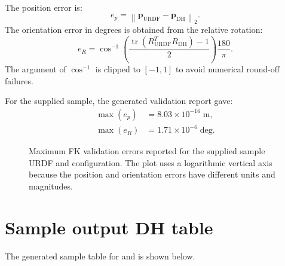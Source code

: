 \documentclass[11pt,a4paper]{article}
\newcommand{\norm}[1]{\left\lVert #1 \right\rVert}
\begin{document}
The position error is:
\begin{equation}
  e_p = \norm{\bm{p}_{\mathrm{URDF}} - \bm{p}_{\mathrm{DH}}}_2.
\end{equation}
The orientation error in degrees is obtained from the relative rotation:
\begin{equation}
  e_R = \cos^{-1}\left(\frac{\operatorname{tr}(R_{\mathrm{URDF}}^T R_{\mathrm{DH}})-1}{2}\right)\frac{180}{\pi}.
\end{equation}
The argument of $\cos^{-1}$ is clipped to $[-1,1]$ to avoid numerical round-off failures.

For the supplied sample, the generated validation report gave:
\begin{align}
  \max(e_p) &= 8.03\times 10^{-16}\;\mathrm{m}, \\
  \max(e_R) &= 1.71\times 10^{-6}\;\mathrm{deg}.
\end{align}

\begin{figure}[htbp]
\centering
{}
\caption{Maximum FK validation errors reported for the supplied sample URDF and configuration. The plot uses a logarithmic vertical axis because the position and orientation errors have different units and magnitudes.}
\end{figure}

\section{Sample output DH table}

The generated sample table for  and  is shown below.
\end{document}
